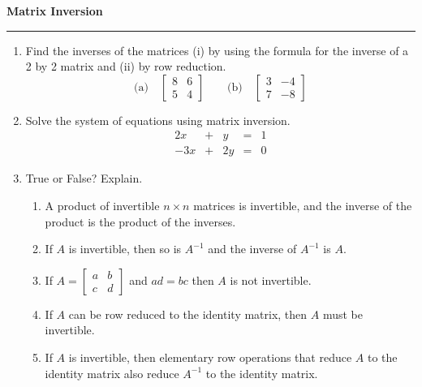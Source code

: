 \documentclass[12pt]{article}
\begin{document}
\begin{center}
{\bf \Large Matrix Inversion}
\vspace{0.2cm}
\hrule
\end{center}



\begin{multicols*}{2}
	\begin{enumerate}
		\item Find the inverses of the matrices (i) by using the formula for the inverse of a 2 by 2 matrix and (ii) by row reduction.
		\[
		\text{(a)}\quad \begin{bmatrix}
			8 & 6\\
			5 & 4
		\end{bmatrix}\qquad\text{(b)}\quad
		\begin{bmatrix}
			3 & -4\\
			7 & -8
		\end{bmatrix}
		\]
		\vfill

		\item Solve the system of equations using matrix inversion.
		\[
		\begin{array}{rcrcr}
			2x & + & y & = & 1\\
			-3x & +&2y & = & 0
		\end{array}
		\]
		\vfill
		\item True or False? Explain.
		\begin{enumerate}
			\item A product of invertible $n\times n$ matrices is invertible, and the inverse of the product is the product of the inverses.
			\vfill
			\item If $A$ is invertible, then so is $A^{-1}$ and the inverse of $A^{-1}$ is $A$.
			\vfill
			\item If $A = \begin{bmatrix}a&b\\c&d\end{bmatrix}$ and $ad=bc$ then $A$ is not invertible.
			\vfill
			\item If $A$ can be row reduced to the identity matrix, then $A$ must be invertible.
			\vfill
			\item If $A$ is invertible, then elementary row operations that reduce $A$ to the identity matrix also reduce $A^{-1}$ to the identity matrix.
		\end{enumerate}
		\vfill\null\columnbreak


\end{enumerate}
\end{multicols*}
\end{document}
